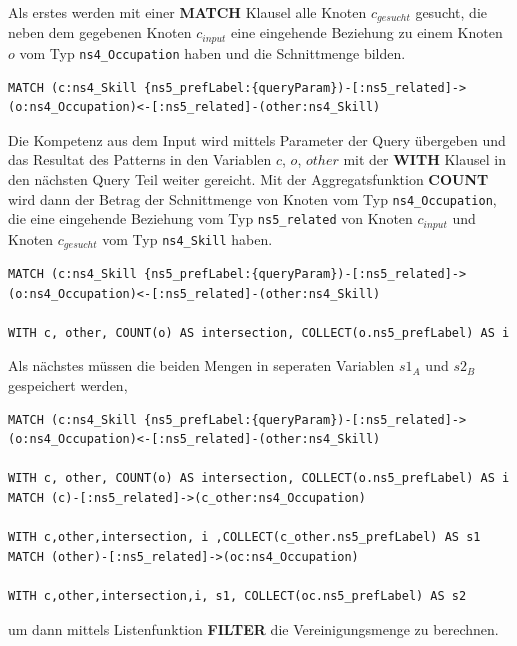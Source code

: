 Als erstes werden mit einer \textbf{MATCH} Klausel alle Knoten $c_{gesucht}$ gesucht, die neben dem gegebenen Knoten $c_{input}$ eine eingehende Beziehung zu einem Knoten $o$ vom Typ \texttt{ns4\_Occupation} haben und die Schnittmenge bilden. 

\begin{lstlisting}
MATCH (c:ns4_Skill {ns5_prefLabel:{queryParam})-[:ns5_related]->(o:ns4_Occupation)<-[:ns5_related]-(other:ns4_Skill)
\end{lstlisting}



Die Kompetenz aus dem Input wird mittels Parameter der Query übergeben und das Resultat des Patterns in den Variablen $c$, $o$, $other$  mit der \textbf{WITH} Klausel in den nächsten Query Teil weiter gereicht. Mit der Aggregatsfunktion \textbf{COUNT} wird dann der Betrag der Schnittmenge von Knoten vom Typ \texttt{ns4\_Occupation}, die eine eingehende Beziehung vom Typ \texttt{ns5\_related} von Knoten $c_{input}$ und Knoten $c_{gesucht}$ vom Typ \texttt{ns4\_Skill} haben. 

\begin{lstlisting}
MATCH (c:ns4_Skill {ns5_prefLabel:{queryParam})-[:ns5_related]->(o:ns4_Occupation)<-[:ns5_related]-(other:ns4_Skill)

WITH c, other, COUNT(o) AS intersection, COLLECT(o.ns5_prefLabel) AS i

\end{lstlisting}

Als nächstes müssen die beiden Mengen in seperaten Variablen $s1_{A}$ und $s2_{B}$ gespeichert werden,

\begin{lstlisting}
MATCH (c:ns4_Skill {ns5_prefLabel:{queryParam})-[:ns5_related]->(o:ns4_Occupation)<-[:ns5_related]-(other:ns4_Skill)

WITH c, other, COUNT(o) AS intersection, COLLECT(o.ns5_prefLabel) AS i
MATCH (c)-[:ns5_related]->(c_other:ns4_Occupation)

WITH c,other,intersection, i ,COLLECT(c_other.ns5_prefLabel) AS s1
MATCH (other)-[:ns5_related]->(oc:ns4_Occupation)

WITH c,other,intersection,i, s1, COLLECT(oc.ns5_prefLabel) AS s2

\end{lstlisting}

um dann mittels Listenfunktion \textbf{FILTER} die Vereinigungsmenge zu berechnen.

